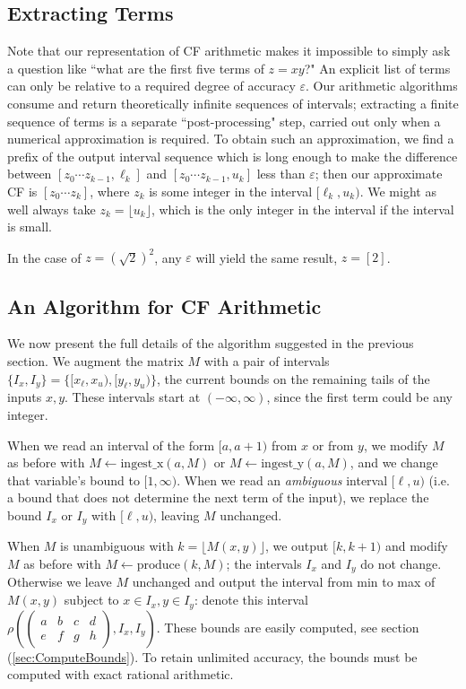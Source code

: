\documentclass[11pt, oneside]{amsart}   	%
\newcommand{\abcd}{\left(
\begin{smallmatrix} 
a & b & c & d\\ 
e & f & g & h
\end{smallmatrix}
\right)}
\renewcommand{\:}{\negthickspace:\negthickspace}
\begin{document}
\subsection{Extracting Terms}
Note that our representation of CF arithmetic makes it impossible to simply ask a question like ``what are the first
five terms of $z = xy$?" An explicit list of terms can only be relative to a required degree of accuracy $\varepsilon$. Our arithmetic
algorithms consume and return theoretically infinite sequences of intervals; extracting a finite sequence of terms is a separate
``post-processing" step, carried out only when a numerical approximation is required.
To obtain such an approximation, we find a prefix of
the output interval sequence which is long enough to make the difference between $[z_0 \cdots z_{k-1}, \ell_k]$ and $[z_0 \cdots
z_{k-1}, u_k]$ less than $\varepsilon$; then our approximate CF is $[z_0 \cdots z_k]$, where $z_k$ is some integer in the interval
$[\ell_k,u_k)$. We might as well always take $z_k = \lfloor u_k \rfloor$, which is the only integer in the interval if the interval is small. 

In the case of $z=(\sqrt{2})^2$, any $\varepsilon$ will yield the same result, $z = [2]$.


\subsection{An Algorithm for CF Arithmetic}\label{sec:finalAlgorithm}
We now present the full details of the algorithm suggested in the previous section.  We augment the matrix $M$ with a pair of intervals
$\{I_x, I_y\} = \{[x_{\ell},x_{u}), [y_{\ell}, y_{u})\}$, the current bounds on the remaining tails of the inputs $x,y$. These
intervals start at $(-\infty, \infty)$, since the first term could be any integer.

When we read an interval of the form $[a,a+1)$ from
$x$ or from $y$, we modify $M$ as before with $M \leftarrow \mbox{ingest\_x}(a,M)$ or $M \leftarrow \mbox{ingest\_y}(a,M)$,
and we change that variable's bound to $[1, \infty)$. When we read an \emph{ambiguous} interval $[\ell, u)$ (i.e. a bound that
does not determine the next term of the input), we replace the bound $I_x$ or $I_y$  with $[\ell, u)$, leaving $M$ unchanged.

When $M$ is unambiguous with $k = \lfloor M(x,y) \rfloor$, we output $[k,k+1)$ and modify $M$ as before with $M \leftarrow \mbox{produce}(k,M)$;
the intervals $I_x$ and $I_y$ do not change. Otherwise we leave $M$ unchanged and output the interval from min to max of $M(x,y)$ subject to $x \in I_x, y \in I_y$:
denote this interval $\rho\left(\abcd, I_x, I_y\right)$.
These bounds are easily computed, see section (\ref{sec:ComputeBounds}).
To retain unlimited accuracy, the bounds must be computed with exact rational arithmetic.
\end{document}
